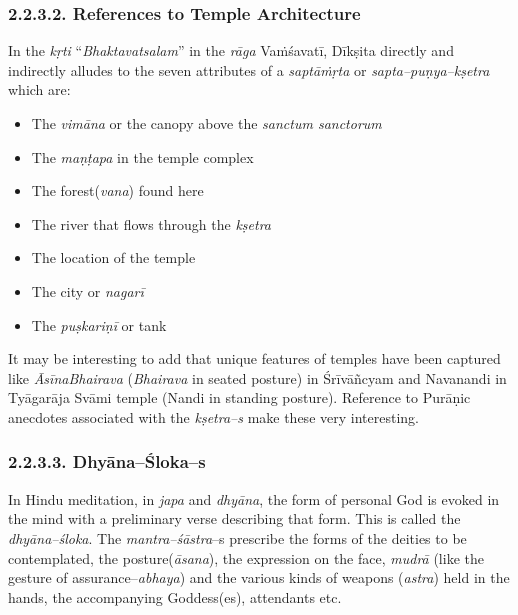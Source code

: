 \subsubsection*{2.2.3.2. References to Temple Architecture}

In the \textit{kṛti} “\textit{Bhaktavatsalam}” in the \textit{rāga} Vaṁśavatī, Dīkṣita directly and indirectly alludes to the seven attributes of a \textit{saptāṁṛta} or \textit{sapta–puṇya–kṣetra} which are:

\begin{itemize}
\itemsep=0pt
\item The \textit{vimāna} or the canopy above the \textit{sanctum sanctorum}

 \item The \textit{maṇṭapa} in the temple complex

 \item The forest(\textit{vana}) found here

 \item The river that flows through the \textit{kṣetra}

 \item The location of the temple

 \item The city or \textit{nagarī}

 \item The \textit{puṣkariṇī} or tank

\end{itemize}

It may be interesting to add that unique features of temples have been captured like \textit{ĀsīnaBhairava} (\textit{Bhairava} in seated posture) in Śrīvāñcyam and Navanandi in Tyāgarāja Svāmi temple (Nandi in standing posture). Reference to Purāṇic anecdotes associated with the \textit{kṣetra–s} make these very interesting.


\subsubsection*{2.2.3.3. Dhyāna–Śloka–s}

In Hindu meditation, in \textit{japa} and \textit{dhyāna}, the form of personal God is evoked in the mind with a preliminary verse describing that form. This is called the \textit{dhyāna–śloka}. The \textit{mantra–śāstra}–s prescribe the forms of the deities to be contemplated, the posture(\textit{āsana}), the expression on the face, \textit{mudrā} (like the gesture of assurance–\textit{abhaya}) and the various kinds of weapons (\textit{astra}) held in the hands, the accompanying Goddess(es), attendants etc.

